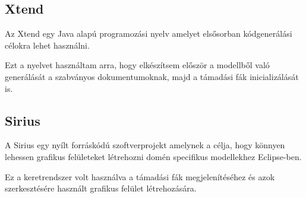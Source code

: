 \subsection{Xtend}

Az Xtend egy Java alapú programozási nyelv amelyet elsősorban kódgenerálási célokra lehet használni.

Ezt a nyelvet használtam arra, hogy elkészítsem először a modellből való generálását a szabványos dokumentumoknak, majd a támadási fák inicializálását is.

\subsection{Sirius}

A Sirius egy nyílt forráskódú szoftverprojekt amelynek a célja, hogy könnyen lehessen grafikus felületeket létrehozni domén specifikus modellekhez Eclipse-ben.

Ez a keretrendszer volt használva a támadási fák megjelenítéséhez és azok szerkesztésére használt grafikus felület létrehozására.